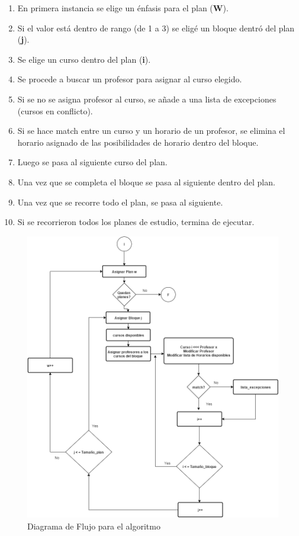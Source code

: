 \documentclass[paper=letter, fontsize=12pt]{article}
\begin{document}
\begin{enumerate}
    \item En primera instancia se elige un énfasis para el plan (\textbf{W}).
    \item Si el valor está dentro de rango (de 1  a 3) se eligé un bloque dentró
    del plan (\textbf{j}).
    \item Se elige un curso dentro del plan (\textbf{i}).
    \item Se procede a buscar un profesor para asignar al curso elegido.
    \item Si se no se asigna profesor al curso, se añade a una lista de
    excepciones (cursos en conflicto).
    \item Si se hace match entre un curso y un horario de un profesor, se
    elimina el horario asignado de las posibilidades de horario dentro del
    bloque.
    \item Luego se pasa al siguiente curso del plan.
    \item Una vez que se completa el bloque se pasa al siguiente dentro del
    plan.
    \item Una vez que se recorre todo el plan, se pasa al siguiente.
    \item Si se recorrieron todos los planes de estudio, termina de ejecutar.
\end{enumerate}

\begin{figure}[H]
\centering
\includegraphics[width=1\textwidth]{flujo.png}
\caption{Diagrama de Flujo para el algoritmo}
\label{F:flujo}
\end{figure}
\end{document}
